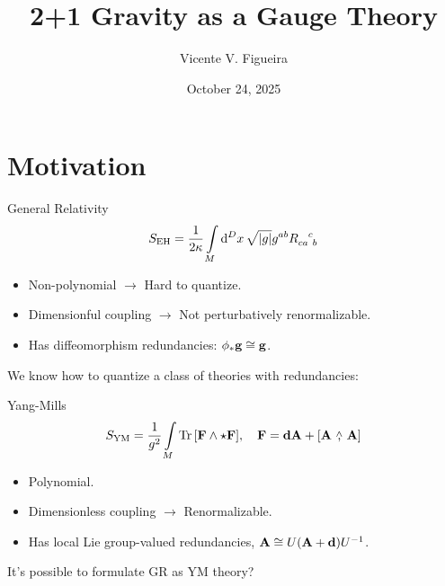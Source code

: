\documentclass{beamer}
\title{2+1 Gravity as a Gauge Theory}
\author{Vicente V. Figueira}
\institute{II Agorá Meeting --- IFUSP}
\date{October 24, 2025}
\newcommand{\wedgecomma}{\stackon[1pt]{,}{\smash{\scriptsize$\wedge$}}}
\newcommand{\wedgecomm}[2]{\qty[ #1\ \wedgecomma\ #2 ]}
\begin{document}
\nocite{*}

\begin{frame}
    \vspace{2cm}
    \titlepage%
\end{frame}


\section{Motivation}
\begin{frame}{General Relativity}
    $$S_{\textnormal{EH}}=\frac{1}{2\kappa}\int\limits_M\dd[D]{x}\sqrt{\abs {g}}g^{ab}\tensor{R}{_c_a^c_b}$$\pause
    \begin{itemize}
        \item Non-polynomial $\rightarrow$ Hard to quantize.\pause
        \item Dimensionful coupling $\rightarrow$ Not perturbatively renormalizable.\pause
        \item Has diffeomorphism redundancies: $\phi_\ast\vb g\cong \vb g $.\pause
    \end{itemize}
    
    \vspace{2cm}

    We know how to quantize a class of theories with redundancies:
\end{frame}

\begin{frame}{Yang-Mills}
    $$S_{\textnormal{YM}}= \frac{1}{g^2}\int\limits_M\Tr\qty[\vb F\wedge \star \vb F],\ \ \ \vb F = \vb d\vb A+\wedgecomm{\vb A}{\vb A}$$
    \begin{itemize}
        \item Polynomial.\pause
        \item Dimensionless coupling $\rightarrow$ Renormalizable.\pause
        \item Has local Lie group-valued redundancies, $\vb A\cong U\qty(\vb A+\vb d)U^{-1}$.\pause
    \end{itemize}

    \vspace{1.5cm}

    It's possible to formulate GR as YM theory?

\end{frame}
\end{document}
